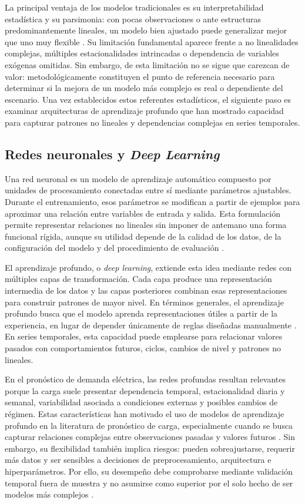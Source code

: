 La principal ventaja de los modelos tradicionales es su interpretabilidad estadística y su parsimonia: con pocas observaciones o ante estructuras predominantemente lineales, un modelo bien ajustado puede generalizar mejor que uno muy flexible \parencite{hyndman2021,petropoulos2022}. Su limitación fundamental aparece frente a no linealidades complejas, múltiples estacionalidades intrincadas o dependencia de variables exógenas omitidas. Sin embargo, de esta limitación no se sigue que carezcan de valor: metodológicamente constituyen el punto de referencia necesario para determinar si la mejora de un modelo más complejo es real o dependiente del escenario. Una vez establecidos estos referentes estadísticos, el siguiente paso es examinar arquitecturas de aprendizaje profundo que han mostrado capacidad para capturar patrones no lineales y dependencias complejas en series temporales.

\subsection{Redes neuronales y \emph{Deep Learning}}

Una red neuronal es un modelo de aprendizaje automático compuesto por unidades de procesamiento conectadas entre sí mediante parámetros ajustables. Durante el entrenamiento, esos parámetros se modifican a partir de ejemplos para aproximar una relación entre variables de entrada y salida. Esta formulación permite representar relaciones no lineales sin imponer de antemano una forma funcional rígida, aunque su utilidad depende de la calidad de los datos, de la configuración del modelo y del procedimiento de evaluación \parencite{goodfellow2016}.

El aprendizaje profundo, o \emph{deep learning}, extiende esta idea mediante redes con múltiples capas de transformación. Cada capa produce una representación intermedia de los datos y las capas posteriores combinan esas representaciones para construir patrones de mayor nivel. En términos generales, el aprendizaje profundo busca que el modelo aprenda representaciones útiles a partir de la experiencia, en lugar de depender únicamente de reglas diseñadas manualmente \parencite{goodfellow2016}. En series temporales, esta capacidad puede emplearse para relacionar valores pasados con comportamientos futuros, ciclos, cambios de nivel y patrones no lineales.

En el pronóstico de demanda eléctrica, las redes profundas resultan relevantes porque la carga suele presentar dependencia temporal, estacionalidad diaria y semanal, variabilidad asociada a condiciones externas y posibles cambios de régimen. Estas características han motivado el uso de modelos de aprendizaje profundo en la literatura de pronóstico de carga, especialmente cuando se busca capturar relaciones complejas entre observaciones pasadas y valores futuros \parencites{hong2020,eren2024}. Sin embargo, su flexibilidad también implica riesgos: pueden sobreajustarse, requerir más datos y ser sensibles a decisiones de preprocesamiento, arquitectura e hiperparámetros. Por ello, su desempeño debe comprobarse mediante validación temporal fuera de muestra y no asumirse como superior por el solo hecho de ser modelos más complejos \parencite{petropoulos2022}.

